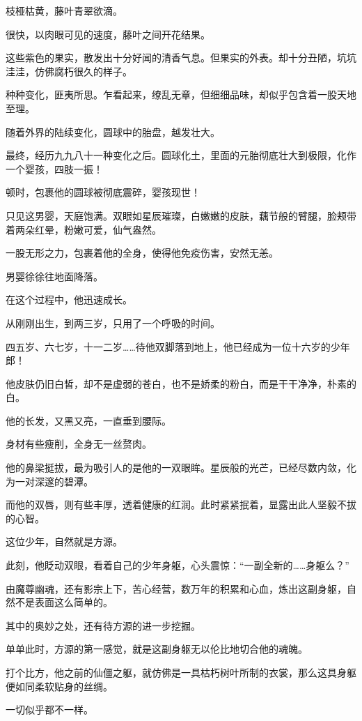 \begin{this_body}
枝桠枯黄，藤叶青翠欲滴。

很快，以肉眼可见的速度，藤叶之间开花结果。

这些紫色的果实，散发出十分好闻的清香气息。但果实的外表。却十分丑陋，坑坑洼洼，仿佛腐朽很久的样子。

种种变化，匪夷所思。乍看起来，缭乱无章，但细细品味，却似乎包含着一股天地至理。

随着外界的陆续变化，圆球中的胎盘，越发壮大。

最终，经历九九八十一种变化之后。圆球化土，里面的元胎彻底壮大到极限，化作一个婴孩，四肢一振！

顿时，包裹他的圆球被彻底震碎，婴孩现世！

只见这男婴，天庭饱满。双眼如星辰璀璨，白嫩嫩的皮肤，藕节般的臂腿，脸颊带着两朵红晕，粉嫩可爱，仙气盎然。

一股无形之力，包裹着他的全身，使得他免疫伤害，安然无恙。

男婴徐徐往地面降落。

在这个过程中，他迅速成长。

从刚刚出生，到两三岁，只用了一个呼吸的时间。

四五岁、六七岁，十一二岁……待他双脚落到地上，他已经成为一位十六岁的少年郎！

他皮肤仍旧白皙，却不是虚弱的苍白，也不是娇柔的粉白，而是干干净净，朴素的白。

他的长发，又黑又亮，一直垂到腰际。

身材有些瘦削，全身无一丝赘肉。

他的鼻梁挺拔，最为吸引人的是他的一双眼眸。星辰般的光芒，已经尽数内敛，化为一对深邃的碧潭。

而他的双唇，则有些丰厚，透着健康的红润。此时紧紧抿着，显露出此人坚毅不拔的心智。

这位少年，自然就是方源。

此刻，他眨动双眼，看着自己的少年身躯，心头震惊：“一副全新的……身躯么？”

由魔尊幽魂，还有影宗上下，苦心经营，数万年的积累和心血，炼出这副身躯，自然不是表面这么简单的。

其中的奥妙之处，还有待方源的进一步挖掘。

单单此时，方源的第一感觉，就是这副身躯无以伦比地切合他的魂魄。

打个比方，他之前的仙僵之躯，就仿佛是一具枯朽树叶所制的衣裳，那么这具身躯便如同柔软贴身的丝绸。

一切似乎都不一样。


\end{this_body}
